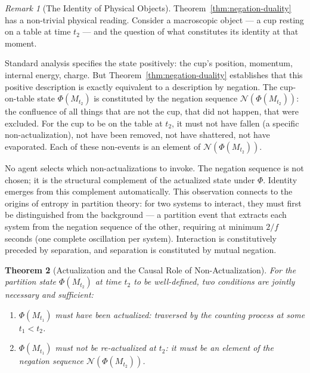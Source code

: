 \documentclass[twocolumn,10pt,a4paper]{article}
\theoremstyle{thmstyle}
\newtheorem{theorem}{Theorem}[section]
\theoremstyle{definition}
\theoremstyle{remark}
\newtheorem{remark}[theorem]{Remark}
\newcommand{\PhiMap}{\varPhi}
\begin{document}
\begin{remark}[The Identity of Physical Objects]
\label{rem:cup}
Theorem~\ref{thm:negation-duality} has a non-trivial physical reading. Consider a macroscopic object --- a cup resting on a table at time $t_2$ --- and the question of what constitutes its identity at that moment.

Standard analysis specifies the state positively: the cup's position, momentum, internal energy, charge. But Theorem~\ref{thm:negation-duality} establishes that this positive description is exactly equivalent to a description by negation. The cup-on-table state $\PhiMap(M_{t_2})$ is constituted by the negation sequence $\mathcal{N}(\PhiMap(M_{t_2}))$: the confluence of all things that are not the cup, that did not happen, that were excluded. For the cup to be on the table at $t_2$, it must not have fallen (a specific non-actualization), not have been removed, not have shattered, not have evaporated. Each of these non-events is an element of $\mathcal{N}(\PhiMap(M_{t_2}))$.

No agent selects which non-actualizations to invoke. The negation sequence is not chosen; it is the structural complement of the actualized state under $\PhiMap$. Identity emerges from this complement automatically. This observation connects to the origins of entropy in partition theory: for two systems to interact, they must first be distinguished from the background --- a partition event that extracts each system from the negation sequence of the other, requiring at minimum $2/f$ seconds (one complete oscillation per system). Interaction is constitutively preceded by separation, and separation is constituted by mutual negation.
\end{remark}

\begin{theorem}[Actualization and the Causal Role of Non-Actualization]
\label{thm:causal-negation}
For the partition state $\PhiMap(M_{t_2})$ at time $t_2$ to be well-defined, two conditions are jointly necessary and sufficient:
\begin{enumerate}[leftmargin=1.5em,label=(\roman*),itemsep=0.1em]
\item $\PhiMap(M_{t_1})$ must have been actualized: traversed by the counting process at some $t_1 < t_2$.
\item $\PhiMap(M_{t_1})$ must not be re-actualized at $t_2$: it must be an element of the negation sequence $\mathcal{N}(\PhiMap(M_{t_2}))$.
\end{enumerate}
\end{theorem}
\end{document}
